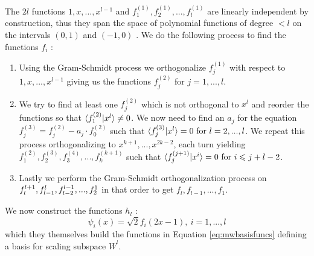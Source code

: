 \documentclass[../master_thesis.tex]{subfiles}
\begin{document}
The $2l$ functions $1, x,..., x^{l-1} $ and $ f^{(1)}_1, f^{(1)}_2, ..., f^{(1)}_l$ are linearly
independent by construction, thus they span the space of polynomial functions of
degree $< l$ on the intervals $(0, 1)$ and $(-1, 0)$ \cite{Alpert1993, Beylkin:MRA}. We do the
following process to find the functions $f_i$ \cite{Alpert1993}:
\begin{enumerate}
  \item Using the Gram-Schmidt process we orthogonalize $f^{(1)}_j$ with respect to $1, x,..., x^{l-1}$
  giving us the functions $f_j^{(2)}$ for $j = 1, ..., l$.
  \item  We try to find at least one $f^{(2)}_j$
  which is not orthogonal to $x^{l}$ and reorder the functions so that $\braket{f_1^{(2)}| x^{l}} \neq 0$.
  We now need to find an $a_j$ for the equation $f_j^{(3)} = f_j^{(2)}-a_j\cdot f_0^{(2)}$ such that
  $\braket{f_j^{(3)}| x^{l}} = 0\  \text{for}\  l = 2, ..., l$. We repeat this process orthogonalizing
  to $x^{k+1}, ..., x^{2k-2}$, each turn yielding $f_1^{(2)}, f_2^{(3)}, f_3^{(4)}, ..., f_k^{(k+1)}$ such that
  $\braket{f_j^{(j+1)}|x^i} = 0 \ \text{for}\  i\leqslant j+l-2$.
  \item  Lastly we perform the Gram-Schmidt orthogonalization process on
  $f_{l}^{l+1}, \\f_{l-1}^{l}, f_{l-2}^{l-1}, ..., f_{2}^{1}$ in that order to get
  $ f_l, f_{l-1}, ..., f_1$.
\end{enumerate}

We now construct the functions $h_l$ \cite{Alpert1993}:
\begin{equation}
  \psi_i(x)= \sqrt{2}f_i(2x-1), \ i= 1, ..., l
\end{equation}
which they themselves build the functions in Equation \ref{eq:mwbasisfuncs}
defining a basis for scaling subspace $W^^l$.
\end{document}
